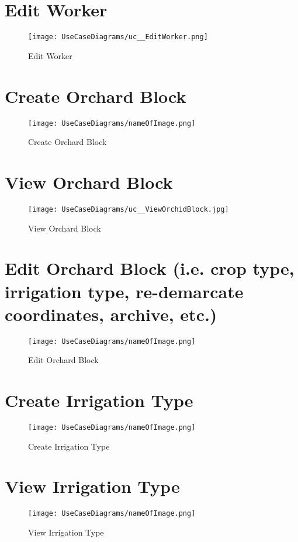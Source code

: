 \documentclass[11pt,fleqn]{book} %
\begin{document}
	\section{Edit Worker}
	\begin{figure}
		\texttt{[image: UseCaseDiagrams/uc\_\_EditWorker.png]}
		\caption{Edit Worker}
	\end{figure}

	\section{Create Orchard Block}
	\begin{figure}
		\texttt{[image: UseCaseDiagrams/nameOfImage.png]}
		\caption{Create Orchard Block}
	\end{figure}
	
	\section{View Orchard Block}
	\begin{figure}
		\texttt{[image: UseCaseDiagrams/uc\_\_ViewOrchidBlock.jpg]}
		\caption{View Orchard Block}
	\end{figure}
	
	\section{Edit Orchard Block (i.e. crop type, irrigation type, re-demarcate coordinates, archive, etc.)}
	\begin{figure}
		\texttt{[image: UseCaseDiagrams/nameOfImage.png]}
		\caption{Edit Orchard Block}
	\end{figure}
	
	\section{Create Irrigation Type}
	\begin{figure}
		\texttt{[image: UseCaseDiagrams/nameOfImage.png]}
		\caption{Create Irrigation Type}
	\end{figure}
	
	\section{View Irrigation Type}
	\begin{figure}
		\texttt{[image: UseCaseDiagrams/nameOfImage.png]}
		\caption{View Irrigation Type}
	\end{figure}
	
\end{document}

